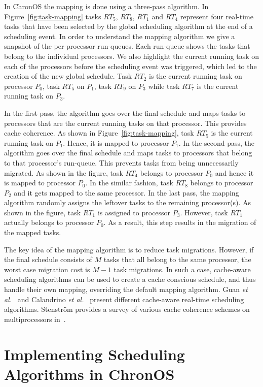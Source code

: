 \documentclass[12pt,dvips]{report}
\begin{document}
In ChronOS the mapping is done using a three-pass algorithm. In Figure~\ref{fig:task-mapping} tasks $RT_5$, $RT_8$, $RT_1$ and $RT_4$ represent four real-time tasks that have been selected by the global scheduling algorithm at the end of a scheduling event. In order to understand the mapping algorithm we give a snapshot of the per-processor run-queues. Each run-queue shows the tasks that belong to the individual processors. We also highlight the current running task on each of the processors before the scheduling event was triggered, which led to the creation of the new global schedule. Task $RT_2$ is the current running task on processor $P_0$, task $RT_5$ on $P_1$, task $RT_9$ on $P_3$ while task $RT_7$ is the current running task on $P_3$.

In the first pass, the algorithm goes over the final schedule and maps tasks to processors that are the current running tasks on that processor. This provides cache coherence. As shown in Figure~\ref{fig:task-mapping}, task $RT_5$ is the current running task on $P_1$. Hence, it is mapped to processor $P_1$. In the second pass, the algorithm goes over the final schedule and maps tasks to processors that belong to that processor's run-queue. This prevents tasks from being unnecessarily migrated. As shown in the figure, task $RT_4$ belongs to processor $P_0$ and hence it is mapped to processor $P_0$. In the similar fashion, task $RT_8$ belongs to processor $P_2$ and it gets mapped to the same processor. In the last pass, the mapping algorithm randomly assigns the leftover tasks to the remaining processor(s). As shown in the figure, task $RT_1$ is assigned to processor $P_3$. However, task $RT_1$ actually belongs to processor $P_0$. As a result, this step results in the migration of the mapped tasks.

The key idea of the mapping algorithm is to reduce task migrations. However, if the final schedule consists of $M$ tasks that all belong to the same processor, the worst case migration cost is $M-1$ task migrations. In such a case, cache-aware scheduling algorithms can be used to create a cache conscious schedule, and thus handle their own mapping, overriding the default mapping algorithm. Guan \textit{et al.}~\cite{guan-cache-aware} and Calandrino \textit{et al.}~\cite{calandrino-cache} present different cache-aware real-time scheduling algorithms. Stenström provides a survey of various cache coherence schemes on multiprocessors in~\cite{CCMultiproc}.

\section{Implementing Scheduling Algorithms in ChronOS}
\end{document}
